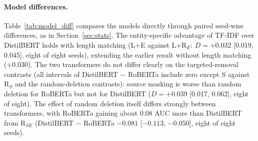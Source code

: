 \begin{table}[t]
\caption{Archived protocol: Matched-control contrasts in cross-dataset AUC, pooled over the six ordered pairs: mean, 95\% interval over eight seeds, and number of seeds agreeing in sign with the mean. Bold: interval excludes zero (before rounding). Above the rule: the six contrasts treated as primary; below: exploratory.}\label{tab:matched_pooled}
\footnotesize
{}
\end{table}

\paragraph{Model differences.}
Table~\ref{tab:model_diff} compares the models directly through paired seed-wise differences, as in Section~\ref{sec:stats}. The entity-specific advantage of TF-IDF over DistilBERT holds with length matching (L+E against L+R$_E$: $D=+0.032$ [0.019, 0.045], eight of eight seeds), extending the earlier result without length matching ($+0.030$). The two transformers do not differ clearly on the targeted-removal contrasts (all intervals of DistilBERT $-$ RoBERTa include zero except S against R$_S$ and the random-deletion contrasts): source masking is worse than random deletion for RoBERTa but not for DistilBERT ($D=+0.039$ [0.017, 0.062], eight of eight). The effect of random deletion itself differs strongly between transformers, with RoBERTa gaining about 0.08 AUC more than DistilBERT from R$_{SE}$ (DistilBERT $-$ RoBERTa $-0.081$ [$-0.113$, $-0.050$], eight of eight seeds).

\begin{table}[t]
\caption{Archived protocol: Paired seed-wise differences in the pooled contrast between two models (mean, 95\% interval over eight seeds, seeds agreeing in sign). Bold: interval excludes zero.}\label{tab:model_diff}
\footnotesize
{}
\end{table}

